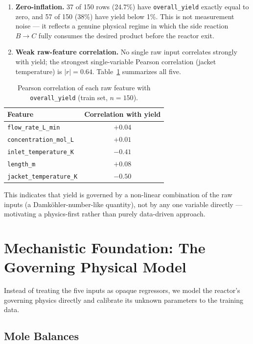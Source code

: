 \documentclass[11pt,a4paper]{article}
\begin{document}
\begin{enumerate}[nosep]
  \item \textbf{Zero-inflation.} 37 of 150 rows (24.7\%) have \texttt{overall\_yield} exactly equal
  to zero, and 57 of 150 (38\%) have yield below 1\%. This is not measurement noise --- it reflects
  a genuine physical regime in which the side reaction $B \rightarrow C$ fully consumes the
  desired product before the reactor exit.
  \item \textbf{Weak raw-feature correlation.} No single raw input correlates strongly with yield;
  the strongest single-variable Pearson correlation (jacket temperature) is $|r| = 0.64$. Table~\ref{tab:corr}
  summarizes all five.
\end{enumerate}

\begin{table}[h]
\centering
\caption{Pearson correlation of each raw feature with \texttt{overall\_yield} (train set, $n=150$).}
\label{tab:corr}
\begin{tabular}{lc}
\toprule
\textbf{Feature} & \textbf{Correlation with yield} \\
\midrule
\texttt{flow\_rate\_L\_min}       & $+0.04$ \\
\texttt{concentration\_mol\_L}    & $+0.01$ \\
\texttt{inlet\_temperature\_K}    & $-0.41$ \\
\texttt{length\_m}                & $+0.08$ \\
\texttt{jacket\_temperature\_K}   & $-0.50$ \\
\bottomrule
\end{tabular}
\end{table}

\noindent This indicates that yield is governed by a non-linear combination of the raw inputs
(a Damk\"{o}hler-number-like quantity), not by any one variable directly ---
motivating a physics-first rather than purely data-driven approach.

\section{Mechanistic Foundation: The Governing Physical Model}
\label{sec:mechanistic}

Instead of treating the five inputs as opaque regressors, we model the reactor's governing
physics directly and calibrate its unknown parameters to the training data.

\subsection{Mole Balances}
\end{document}
